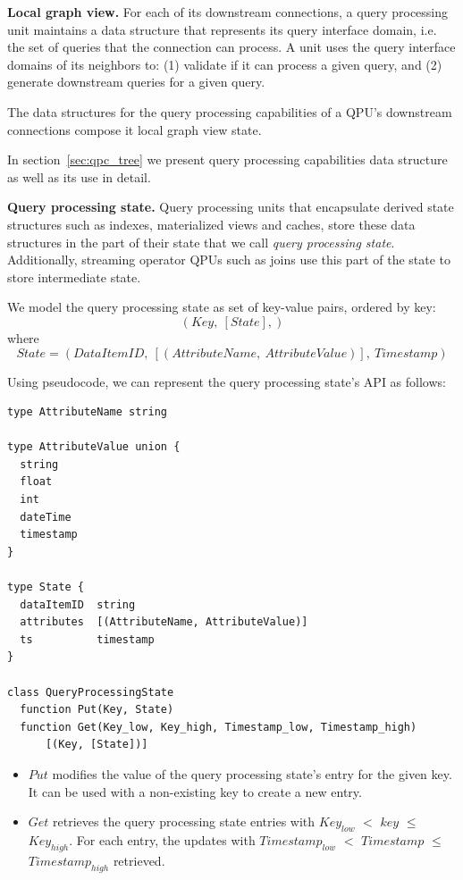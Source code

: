\medskip
\noindent
\textbf{Local graph view.}
For each of its downstream connections, a query processing unit maintains a data structure that represents
its query interface domain, i.e. the set of queries that the connection can process.
A unit uses the query interface domains of its neighbors to:
(1) validate if it can process a given query, and
(2) generate downstream queries for a given query.

The data structures for the query processing capabilities of a QPU's downstream connections compose it local graph view
state.

In section~\ref{sec:qpc_tree} we present query processing capabilities data structure as well as its use in detail.

\medskip
\noindent
\textbf{Query processing state.}
Query processing units that encapsulate derived state structures such as indexes, materialized views and
caches, store these data structures in the part of their state that we call \textit{query processing state}.
Additionally, streaming operator QPUs such as joins use this part of the state to store intermediate state.

We model the query processing state as set of key-value pairs, ordered by key:
\[
  (Key,~[State],)
\]
where
\[
  State = (DataItemID,~[(AttributeName,~AttributeValue)],~Timestamp)
\]


Using pseudocode, we can represent the query processing state's API as follows:

\begin{lstlisting}[caption={Pseudocode for the QPU's query processing state},captionpos=b,label={lst:qpustate}, frame=tlrb]
type AttributeName string

type AttributeValue union {
  string
  float
  int
  dateTime
  timestamp
}

type State {
  dataItemID  string
  attributes  [(AttributeName, AttributeValue)]
  ts          timestamp
}

class QueryProcessingState
  function Put(Key, State)
  function Get(Key_low, Key_high, Timestamp_low, Timestamp_high)
      [(Key, [State])]
\end{lstlisting}

\begin{itemize}
  \item $Put$ modifies the value of the query processing state's entry for the given key.
  It can be used with a non-existing key to create a new entry.

  \item $Get$ retrieves the query processing state entries with $Key_{low}$ $<$ $key$ $\leq$ $Key_{high}$.
  For each entry, the updates with $Timestamp_{low}$ $<$ $Timestamp$ $\leq$ $Timestamp_{high}$ retrieved.
\end{itemize}

